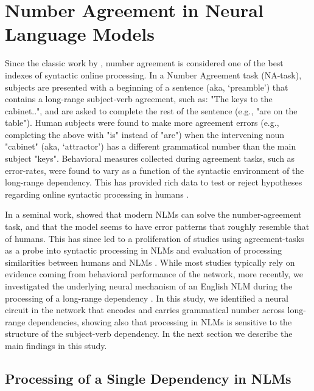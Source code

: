 \section{Number Agreement in Neural Language Models}
Since the classic work by \citet{Bock:Miller:1991}, number agreement is considered one of the best indexes of syntactic online processing. In a Number Agreement task (NA-task), subjects are presented with a beginning of a sentence (aka, `preamble') that contains a long-range subject-verb agreement, such as: "The keys to the cabinet..", and are asked to complete the rest of the sentence (e.g., "are on the table"). Human subjects were found to make more agreement errors (e.g., completing the above with "is" instead of "are") when the intervening noun "cabinet" (aka, `attractor') has a different grammatical number than the main subject "keys". Behavioral measures collected during agreement tasks, such as error-rates, were found to vary as a function of the syntactic environment of the long-range dependency. This has provided rich data to test or reject hypotheses regarding online syntactic processing in humans \citep[e.g., ][]{franck2002subject, franck2006agreement, franck2007syntactic}.

In a seminal work, \citet{Linzen:etal:2016} showed that modern NLMs can solve the number-agreement task, and that the model seems to have error patterns that roughly resemble that of humans. This has since led to a proliferation of studies using agreement-tasks as a probe into syntactic processing in NLMs \citep[e.g.,][]{Gulordava:etal:2018, Kuncoro:etal:2018a} and evaluation of processing similarities between humans and NLMs \citep[e.g.,][]{Linzen:Leonard:2018}. While most studies typically rely on evidence coming from behavioral performance of the network, more recently, we investigated the underlying neural mechanism of an English NLM during the processing of a long-range dependency \citep{lakretz2019emergence}. In this study, we identified a neural circuit in the network that encodes and carries grammatical number across long-range dependencies, showing also that processing in NLMs is sensitive to the structure of the subject-verb dependency. In the next section we describe the main findings in this study.

\subsection{Processing of a Single Dependency in NLMs}
